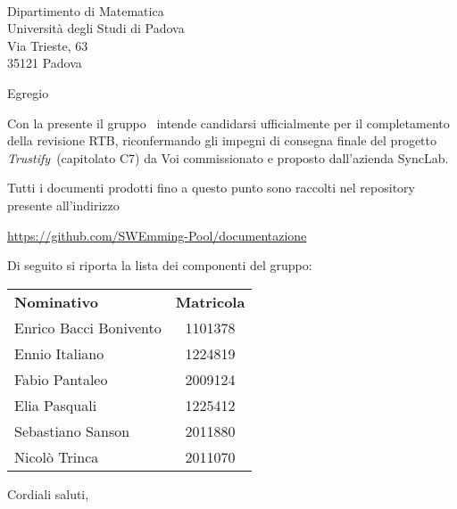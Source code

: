 \documentclass[12pt, boldsubject, italicsignature, noindent]{letteracdp}
\date{}
\renewcommand{\capName}{\textit{Trustify}} %
\renewcommand{\capCode}{C7} %
\renewcommand{\capProposer}{SyncLab} %
\begin{document}
\begin{letter}{
        \Vardanega \\
        Dipartimento di Matematica \\
        Università degli Studi di Padova \\
        Via Trieste, 63 \\ 35121 Padova
    }

    \opening{Egregio \vardanega}

    Con la presente il gruppo \groupName\ intende candidarsi ufficialmente per il completamento della revisione RTB, riconfermando gli impegni di consegna finale del progetto \capName\ (capitolato \capCode) da Voi commissionato e proposto dall'azienda \capProposer.

    Tutti i documenti prodotti fino a questo punto sono raccolti nel repository presente all'indirizzo
    \begin{center}
        \url{https://github.com/SWEmming-Pool/documentazione}
    \end{center}

    Di seguito si riporta la lista dei componenti del gruppo:

    \begin{center}
        \begin{tabular}{l|c}
            \textbf{Nominativo}    & \textbf{Matricola} \\
            Enrico Bacci Bonivento & 1101378            \\
            Ennio Italiano         & 1224819            \\
            Fabio Pantaleo         & 2009124            \\
            Elia Pasquali          & 1225412            \\
            Sebastiano Sanson      & 2011880            \\
            Nicolò Trinca          & 2011070
        \end{tabular}
    \end{center}

    \closing{Cordiali saluti,}

\end{letter}
\end{document}
